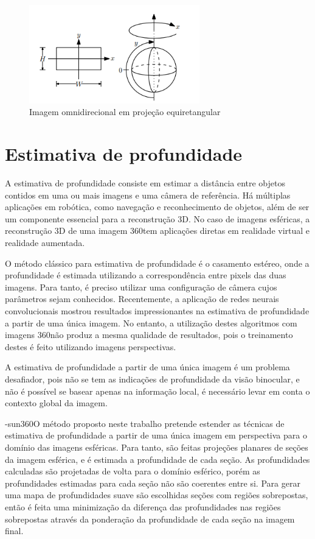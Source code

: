\documentclass[cic,tc]{iiufrgs}
\begin{document}
\begin{figure}
    \caption{Imagem omnidirecional em projeção equiretangular}
    \begin{center}
        \includegraphics[width=20em]{equiretangular.png}
    \end{center}
    \label{fig:sphericalIm}
\end{figure}

\section{Estimativa de profundidade}

A estimativa de profundidade consiste em estimar a distância entre objetos contidos em uma ou mais imagens e uma câmera de referência. Há múltiplas aplicações em robótica, como navegação e reconhecimento de objetos, além de ser um componente essencial para a reconstrução 3D. No caso de imagens esféricas, a reconstrução 3D de uma imagem 360\degree tem aplicações diretas em realidade virtual e realidade aumentada.

O método clássico para estimativa de profundidade é o casamento estéreo, onde a profundidade é estimada utilizando a correspondência entre pixels das duas imagens. Para tanto, é preciso utilizar uma configuração de câmera cujos parâmetros sejam conhecidos. Recentemente, a aplicação de redes neurais convolucionais mostrou resultados impressionantes na estimativa de profundidade a partir de uma única imagem. No entanto, a utilização destes algoritmos com imagens 360\degree não produz a mesma qualidade de resultados, pois o treinamento destes é feito utilizando imagens perspectivas. 

A estimativa de profundidade a partir de uma única imagem é um problema desafiador, pois não se tem as indicações de profundidade da visão binocular, e não é possível se basear apenas na informação local, é necessário levar em conta o contexto global da imagem.

-sun360O método proposto neste trabalho pretende estender as técnicas de estimativa de profundidade a partir de uma única imagem em perspectiva para o domínio das imagens esféricas. Para tanto, são feitas projeções planares de seções da imagem esférica, e é estimada a profundidade de cada seção. As profundidades calculadas são projetadas de volta para o domínio esférico, porém as profundidades estimadas para cada seção não são coerentes entre si.
Para gerar uma mapa de profundidades suave são escolhidas seções com regiões sobrepostas, então é feita uma minimização da diferença das profundidades nas regiões sobrepostas através da ponderação da profundidade de cada seção na imagem final.
\end{document}
